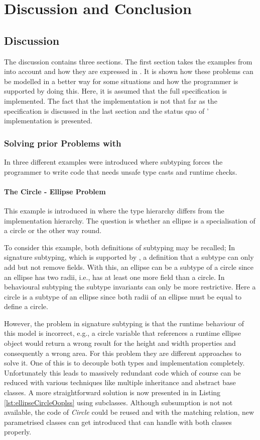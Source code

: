 
\chapter{Discussion and Conclusion}
\label{ctr:discussionConclusion}
\section{Discussion}
\label{ctr:discussion}
The discussion contains three sections. The first section takes the examples from
 into account and how they are expressed
in \ooplss. It is shown how these problems can be modelled in a better
way for some situations and how the programmer is supported by doing this. 
Here, it is assumed that the full specification is implemented. 
The fact that the implementation is not that far as the specification
is discussed in the last section and the status quo of \ooplss'
implementation is presented.

\subsection{Solving prior Problems with \ooplss}
In  three different examples were
introduced where subtyping forces the programmer to write code that
needs unsafe type casts and runtime checks.

\subsubsection{The Circle - Ellipse Problem}
This example is introduced in  where the type
hierarchy differs from the implementation hierarchy. The question is whether an ellipse
is a specialisation of a circle or the other way round.

To consider this example, both definitions of subtyping may be recalled;
In signature subtyping, which is supported by \ooplss, a
definition that a subtype can only add but not remove fields. With this,
an ellipse can be a subtype of a circle since an ellipse has two radii,
i.e., has at least one more field than a circle. In behavioural subtyping
the subtype invariants can only be more restrictive. Here a circle is
a subtype of an ellipse since both radii of an ellipse must be equal
to define a circle.

However, the problem in signature subtyping is that the runtime behaviour
of this model is incorrect, e.g., a circle variable that references a
runtime ellipse object would return a wrong result for the height and
width properties and consequently a wrong area. For this problem
they are different approaches to solve it. One of this is to
decouple both types and implementation completely. Unfortunately this
leads to massively redundant code which of course can be reduced with
various techniques like multiple inheritance and abstract base classes. A
more straightforward solution is now presented in \ooplss in Listing
\ref{lst:ellipseCircleOoplss} using subclasses. Although subsumption
is not not available, the code of \emph{Circle} could be reused and with the
matching relation, new parametrised classes can get introduced that can
handle with both classes properly.

